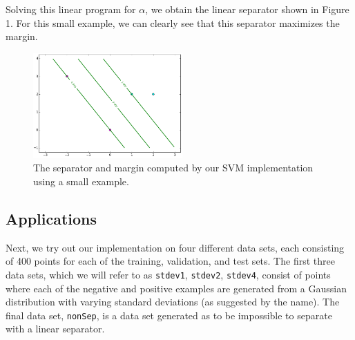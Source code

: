 \documentclass{sigchi}
\begin{document}
\large
Solving this linear program for $\alpha$, we obtain the linear separator shown in Figure 1. For this small example, we can clearly see that this separator maximizes the margin.

\begin{figure}
\centering
\includegraphics[width=2.25in]{plots/1-1.png}
\caption{The separator and margin computed by our SVM implementation using a small example.}
\end{figure}

\subsection{Applications}

Next, we try out our implementation on four different data sets, each consisting of 400 points for each of the training, validation, and test sets. The first three data sets, which we will refer to as \texttt{stdev1}, \texttt{stdev2}, \texttt{stdev4}, consist of points where each of the negative and positive examples are generated from a Gaussian distribution with varying standard deviations (as suggested by the name). The final data set, \texttt{nonSep}, is a data set generated as to be impossible to separate with a linear separator.
\end{document}
